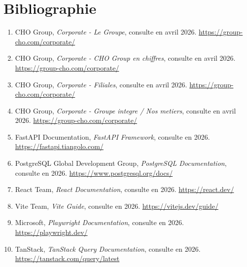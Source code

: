 \chapter*{Bibliographie}

\begin{enumerate}[leftmargin=1.2cm]
	\item CHO Group, \textit{Corporate - Le Groupe}, consulte en avril 2026. \url{https://group-cho.com/corporate/}
	\item CHO Group, \textit{Corporate - CHO Group en chiffres}, consulte en avril 2026. \url{https://group-cho.com/corporate/}
	\item CHO Group, \textit{Corporate - Filiales}, consulte en avril 2026. \url{https://group-cho.com/corporate/}
	\item CHO Group, \textit{Corporate - Groupe integre / Nos metiers}, consulte en avril 2026. \url{https://group-cho.com/corporate/}
	\item FastAPI Documentation, \textit{FastAPI Framework}, consulte en 2026. \url{https://fastapi.tiangolo.com/}
	\item PostgreSQL Global Development Group, \textit{PostgreSQL Documentation}, consulte en 2026. \url{https://www.postgresql.org/docs/}
	\item React Team, \textit{React Documentation}, consulte en 2026. \url{https://react.dev/}
	\item Vite Team, \textit{Vite Guide}, consulte en 2026. \url{https://vitejs.dev/guide/}
	\item Microsoft, \textit{Playwright Documentation}, consulte en 2026. \url{https://playwright.dev/}
	\item TanStack, \textit{TanStack Query Documentation}, consulte en 2026. \url{https://tanstack.com/query/latest}
\end{enumerate}

\clearpage
